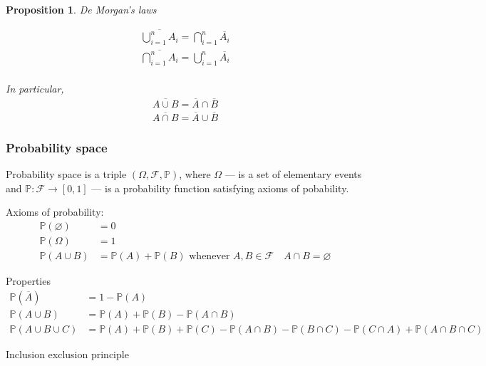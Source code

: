 \documentclass[10pt]{article}
\newtheorem*{proposition}{Proposition}
\begin{document}
\begin{proposition} De Morgan's laws

    \begin{align}
        \overline{\bigcup_{i=1}^n A_i}=\bigcap_{i=1}^n\overline{A_i} \\
        \overline{\bigcap_{i=1}^n A_i}=\bigcup_{i=1}^n\overline{A_i} \\
    \end{align}

    In particular,
    \begin{align}
        \overline{A\cup B}=\overline{A}\cap\overline{B} \\
        \overline{A\cap B}=\overline{A}\cup\overline{B}
    \end{align}

\end{proposition}

\subsubsection{Probability space}

Probability space is a triple $(\Omega, \mathcal{F}, \mathbb{P})$, where
$\Omega$ --- is a set of elementary events and $\mathbb{P}:\mathcal{F}\to [0,1]$
--- is a probability function satisfying axioms of pobability.

Axioms of probability:
\begin{align}
    \mathbb{P}(\varnothing) & =0 \\
    \mathbb{P}(\Omega)      & =1 \\
    \mathbb{P}(A\cup B)     &
    =\mathbb{P}(A)+\mathbb{P}(B)
    \mbox{ whenever } A,B\in\mathcal{F}\quad A\cap B=\varnothing
\end{align}

Properties
\begin{align}
    \mathbb{P}(\overline{A})  &
    =1-\mathbb{P}(A)            \\
    \mathbb{P}(A\cup B)       &
    =\mathbb{P}(A)+
    \mathbb{P}(B)-
    \mathbb{P}(A\cap B)         \\
    \mathbb{P}(A\cup B\cup C) &
    =\mathbb{P}(A)+
    \mathbb{P}(B)+\mathbb{P}(C)-
    \mathbb{P}(A\cap B)-
    \mathbb{P}(B\cap C)-
    \mathbb{P}(C\cap A)+
    \mathbb{P}(A\cap B\cap C)
\end{align}

Inclusion exclusion principle
\end{document}
